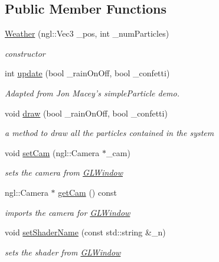 \subsection*{Public Member Functions}
\begin{DoxyCompactItemize}
\item 
\hyperlink{classWeather_a148a749b4d95904c972e533d4aba3369}{Weather} (ngl::Vec3 \_\-pos, int \_\-numParticles)
\begin{DoxyCompactList}\small\item\em constructor \item\end{DoxyCompactList}\item 
int \hyperlink{classWeather_ac6f35667da53d25e368ca7c55b1635f0}{update} (bool \_\-rainOnOff, bool \_\-confetti)
\begin{DoxyCompactList}\small\item\em Adapted from Jon Macey's simpleParticle demo. \item\end{DoxyCompactList}\item 
void \hyperlink{classWeather_a9a87fb547a7312e1c645b5c0e4ff580d}{draw} (bool \_\-rainOnOff, bool \_\-confetti)
\begin{DoxyCompactList}\small\item\em a method to draw all the particles contained in the system \item\end{DoxyCompactList}\item 
void \hyperlink{classWeather_a9c19c5387f67875053c4dc274fb7cd49}{setCam} (ngl::Camera $\ast$\_\-cam)
\begin{DoxyCompactList}\small\item\em sets the camera from \hyperlink{classGLWindow}{GLWindow} \item\end{DoxyCompactList}\item 
ngl::Camera $\ast$ \hyperlink{classWeather_a594b7ade4a05f1cfdc70480d562fbc71}{getCam} () const 
\begin{DoxyCompactList}\small\item\em imports the camera for \hyperlink{classGLWindow}{GLWindow} \item\end{DoxyCompactList}\item 
void \hyperlink{classWeather_aa4e71bd1c04b189f74cd426ae777cfcf}{setShaderName} (const std::string \&\_\-n)
\begin{DoxyCompactList}\small\item\em sets the shader from \hyperlink{classGLWindow}{GLWindow} \item\end{DoxyCompactList}\item 

\end{DoxyCompactItemize}
